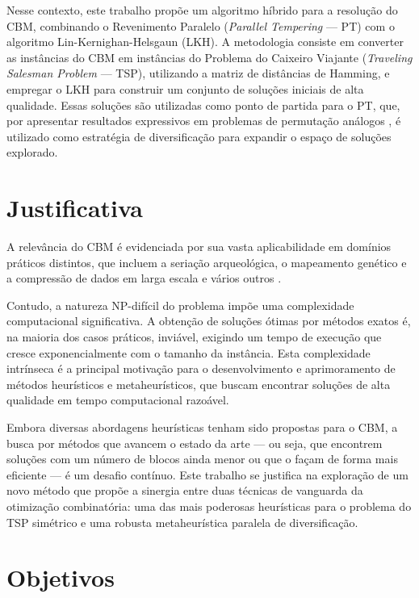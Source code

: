 Nesse contexto, este trabalho propõe um algoritmo híbrido para a resolução do CBM, combinando o Revenimento Paralelo (\textit{Parallel Tempering} — PT) com o algoritmo Lin-Kernighan-Helsgaun (LKH). A metodologia consiste em converter as instâncias do CBM em instâncias do Problema do Caixeiro Viajante (\textit{Traveling Salesman Problem} — TSP), utilizando a matriz de distâncias de Hamming, e empregar o LKH para construir um conjunto de soluções iniciais de alta qualidade. Essas soluções são utilizadas como ponto de partida para o PT, que, por apresentar resultados expressivos em problemas de permutação análogos \cite{ALMEIDA2025107000}, é utilizado como estratégia de diversificação para expandir o espaço de soluções explorado.

\section{Justificativa}

A relevância do CBM é evidenciada por sua vasta aplicabilidade em domínios práticos distintos, que incluem a seriação arqueológica, o mapeamento genético e a compressão de dados em larga escala e vários outros \cite{kendall1969incidence, alizadeh1995physical, lemire2011reordering}.

Contudo, a natureza NP-difícil do problema \cite{kou1977polynomial} impõe uma complexidade computacional significativa. A obtenção de soluções ótimas por métodos exatos é, na maioria dos casos práticos, inviável, exigindo um tempo de execução que cresce exponencialmente com o tamanho da instância. Esta complexidade intrínseca é a principal motivação para o desenvolvimento e aprimoramento de métodos heurísticos e metaheurísticos, que buscam encontrar soluções de alta qualidade em tempo computacional razoável.

Embora diversas abordagens heurísticas tenham sido propostas para o CBM, a busca por métodos que avancem o estado da arte — ou seja, que encontrem soluções com um número de blocos ainda menor ou que o façam de forma mais eficiente — é um desafio contínuo. Este trabalho se justifica na exploração de um novo método que propõe a sinergia entre duas técnicas de vanguarda da otimização combinatória: uma das mais poderosas heurísticas para o problema do TSP simétrico e uma robusta metaheurística paralela de diversificação.

\section{Objetivos}

